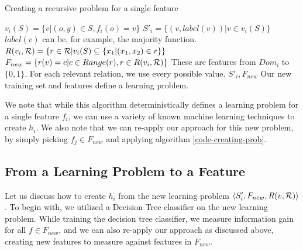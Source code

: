 \documentclass[twoside,11pt]{article}
\theoremstyle{definition}
\begin{document}
\begin{algorithm}[H]
	\caption{Creating a recursive problem for a single feature}
	\label{code-creating-prob}
	\small
		\begin{algorithmic}
                \State $v_i(S) = \{v | (o,y) \in S, f_{i}(o)=v\}$
                \State $S'_i = \{ (v, label(v)) | v \in v_i(S) \}$ 
                \Comment $label(v)$ can be, for example, the majority function.
                \State $R(v_i,{\cal R}) = \left\{ r \in {\cal R} | v_i(S) \subseteq \{x_1 | (x_1,x_2) \in r\}\right\}$
                \State $F_{new}=\{r(v)=c| c\in Range(r), r\in R(v_i,{\cal R})\}$
                \State \Comment These are features from $Dom_{i}$ to $\{0,1\}$. For each relevant relation, we use every possible value.
                \Return $S'_i, F_{new}$ 
                \Comment Our new training set and features define a learning problem.
			\EndFunction
			
		\end{algorithmic}
	\end{algorithm}

We note that while this algorithm deterministically defines a learning problem for a single feature $f_i$, we can use a variety of known machine learning techniques to create $h_i$.
We also note that we can re-apply our approach for this new problem, by simply picking $f_j\in F_{new}$ and applying algorithm \ref{code-creating-prob}.

\subsection{From a Learning Problem to a Feature} \label{why_tree}

Let us discuss how to create $h_i$ from the new learning problem $\langle S'_i,F_{new},R(v,{\cal R})\rangle$.
To begin with, we utilized a Decision Tree classifier \cite{quinlan1986} on the new learning problem. While training the decision tree classifier, we measure information gain for all $f\in F_{new}$, and we can also re-apply our approach as discussed above, creating new features to measure against features in $F_{new}$.
\end{document}
